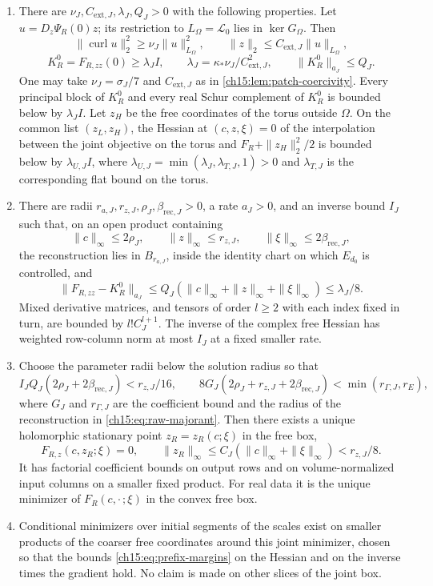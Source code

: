 \begin{theorem}
\begin{enumerate}
\item There are $\nu_J,C_{\mathrm{ext},J},\lambda_J,Q_J>0$ with the following properties. Let $u=D_z\Psi_R(0)z$; its restriction to $L_\Omega=\mathcal L_0$ lies in $\ker G_\Omega$. Then
\[
 \|\operatorname{curl}u\|_2^2\ge\nu_J\|u\|_{L_\Omega}^2,
 \qquad \|z\|_2\le C_{\mathrm{ext},J}\|u\|_{L_\Omega},
\]
\[
 K_R^0=F_{R,zz}(0)\ge\lambda_J I,\qquad
 \lambda_J=\kappa_*\nu_J/C_{\mathrm{ext},J}^2,
 \qquad\|K_R^0\|_{a_J}\le Q_J .
\]
One may take $\nu_J=\sigma_J/7$ and $C_{\mathrm{ext},J}$ as in \cref{ch15:lem:patch-coercivity}. Every principal block of $K_R^0$ and every real Schur complement of $K_R^0$ is bounded below by $\lambda_JI$. Let $z_H$ be the free coordinates of the torus outside $\Omega$. On the common list $(z_L,z_H)$, the Hessian at $(c,z,\xi)=0$ of the interpolation between the joint objective on the torus and $F_R+\|z_H\|_2^2/2$ is bounded below by $\lambda_{U,J}I$, where $\lambda_{U,J}=\min(\lambda_J,\lambda_{T,J},1)>0$ and $\lambda_{T,J}$ is the corresponding flat bound on the torus.
\item There are radii $r_{a,J},r_{z,J},\rho_J,\beta_{\mathrm{rec},J}>0$, a rate $a_J>0$, and an inverse bound $I_J$ such that, on an open product containing
\[
 \|c\|_\infty\le2\rho_J,\qquad
 \|z\|_\infty\le r_{z,J},\qquad
 \|\xi\|_\infty\le2\beta_{\mathrm{rec},J},
\]
the reconstruction lies in $B_{r_{a,J}}$, inside the identity chart on which $E_{d_0}$ is controlled, and
\[
 \|F_{R,zz}-K_R^0\|_{a_J}
 \le Q_J(\|c\|_\infty+\|z\|_\infty+\|\xi\|_\infty)
                                      \le\lambda_J/8 .
\]
Mixed derivative matrices, and tensors of order $l\ge2$ with each index fixed in turn, are bounded by $l!C_J^{l+1}$. The inverse of the complex free Hessian has weighted row-column norm at most $I_J$ at a fixed smaller rate.
\item Choose the parameter radii below the solution radius so that
\[
 I_JQ_J(2\rho_J+2\beta_{\mathrm{rec},J})<r_{z,J}/16,
 \qquad
 8G_J(2\rho_J+r_{z,J}+2\beta_{\mathrm{rec},J})
                      <\min(r_{\Gamma,J},r_E),
\]
where $G_J$ and $r_{\Gamma,J}$ are the coefficient bound and the radius of the reconstruction in \eqref{ch15:eq:raw-majorant}. Then there exists a unique holomorphic stationary point $z_R=z_R(c;\xi)$ in the free box,
\[
 F_{R,z}(c,z_R;\xi)=0,\qquad
 \|z_R\|_\infty\le C_J(\|c\|_\infty+\|\xi\|_\infty)
                                      <r_{z,J}/8 .
\]
It has factorial coefficient bounds on output rows and on volume-normalized input columns on a smaller fixed product. For real data it is the unique minimizer of $F_R(c,\cdot\,;\xi)$ in the convex free box.
\item Conditional minimizers over initial segments of the scales exist on smaller products of the coarser free coordinates around this joint minimizer, chosen so that the bounds \eqref{ch15:eq:prefix-margins} on the Hessian and on the inverse times the gradient hold. No claim is made on other slices of the joint box.
\end{enumerate}
\end{theorem}


